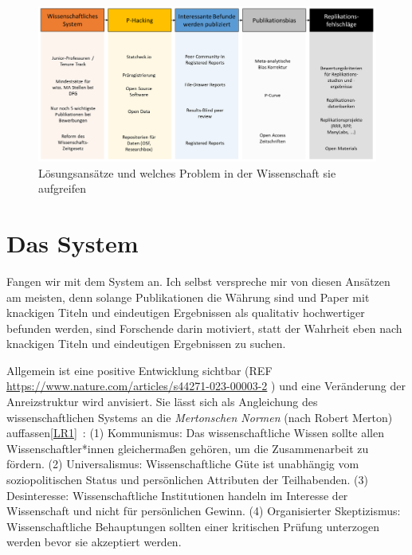 \documentclass[
  letterpaper,
  DIV=11,
  numbers=noendperiod]{scrreprt}
\begin{document}
\begin{figure}[H]

{\centering \includegraphics{images/lösungsansätze.png}

}

\caption{Lösungsansätze und welches Problem in der Wissenschaft sie
aufgreifen}

\end{figure}%

\section*{}\label{section}

\markright{}

\chapter{Das System}\label{das-system}

Fangen wir mit dem System an. Ich selbst verspreche mir von diesen
Ansätzen am meisten, denn solange Publikationen die Währung sind und
Paper mit knackigen Titeln und eindeutigen Ergebnissen als qualitativ
hochwertiger befunden werden, sind Forschende darin motiviert, statt der
Wahrheit eben nach knackigen Titeln und eindeutigen Ergebnissen zu
suchen.

Allgemein ist eine positive Entwicklung sichtbar (REF
\url{https://www.nature.com/articles/s44271-023-00003-2} ) und eine
Veränderung der Anreizstruktur wird anvisiert. Sie lässt sich als
Angleichung des wissenschaftlichen Systems an die \emph{Mertonschen
Normen} (nach Robert Merton) auffassen\hyperref[_msocom_1]{{[}LR1{]}}~:
(1) Kommunismus: Das wissenschaftliche Wissen sollte allen
Wissenschaftler*innen gleichermaßen gehören, um die Zusammenarbeit zu
fördern. (2) Universalismus: Wissenschaftliche Güte ist unabhängig vom
soziopolitischen Status und persönlichen Attributen der Teilhabenden.
(3) Desinteresse: Wissenschaftliche Institutionen handeln im Interesse
der Wissenschaft und nicht für persönlichen Gewinn. (4) Organisierter
Skeptizismus: Wissenschaftliche Behauptungen sollten einer kritischen
Prüfung unterzogen werden bevor sie akzeptiert werden.
\end{document}
